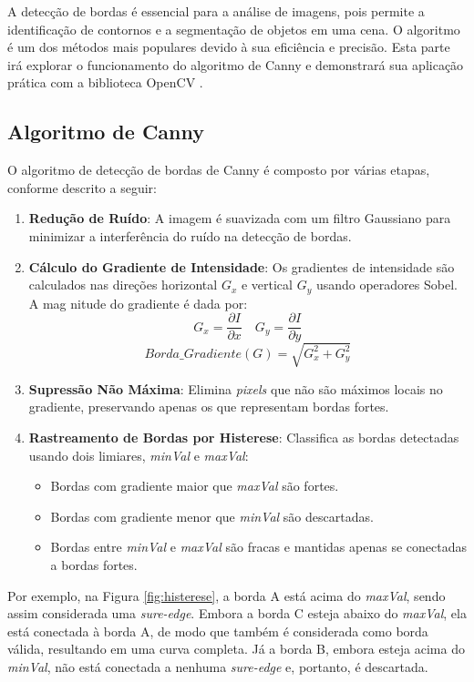 A detecção de bordas é essencial para a análise de imagens, pois permite a identificação de contornos e a segmentação de objetos em uma cena. O algoritmo \cite{Canny} é um dos métodos mais populares devido à sua eficiência e precisão. Esta parte irá explorar o funcionamento do algoritmo de Canny e demonstrará sua aplicação prática com a biblioteca OpenCV \cite{CannyAplicacao}.

\subsection{Algoritmo de Canny}

O algoritmo de detecção de bordas de Canny é composto por várias etapas, conforme descrito a seguir:

\begin{enumerate}
    \item \textbf{Redução de Ruído}: A imagem é suavizada com um filtro Gaussiano para minimizar a interferência do ruído na detecção de bordas.

    \item \textbf{Cálculo do Gradiente de Intensidade}: Os gradientes de intensidade são calculados nas direções horizontal \(G_x\) e vertical \(G_y\) usando operadores Sobel. A mag   nitude do gradiente é dada por:
    \[G_x = \frac{\partial I}{\partial x} \quad G_y = \frac{\partial I}{\partial y}\]
    \[Borda\_Gradiente(G) = \sqrt{G_{x}^{2} + G_{y}^{2}}\]

    \item \textbf{Supressão Não Máxima}: Elimina \textit{pixels} que não são máximos locais no gradiente, preservando apenas os que representam bordas fortes.

    \item \textbf{Rastreamento de Bordas por Histerese}: Classifica as bordas detectadas usando dois limiares, \textit{minVal} e \textit{maxVal}:
    \begin{itemize}
        \item Bordas com gradiente maior que \textit{maxVal} são fortes.
        \item Bordas com gradiente menor que \textit{minVal} são descartadas.
        \item Bordas entre \textit{minVal} e \textit{maxVal} são fracas e mantidas apenas se conectadas a bordas fortes.
    \end{itemize}
\end{enumerate}

Por exemplo, na Figura \autoref{fig:histerese}, a borda A está acima do \textit{maxVal}, sendo assim considerada uma \textit{sure-edge}. Embora a borda C esteja abaixo do \textit{maxVal}, ela está conectada à borda A, de modo que também é considerada como borda válida, resultando em uma curva completa. Já a borda B, embora esteja acima do \textit{minVal}, não está conectada a nenhuma \textit{sure-edge} e, portanto, é descartada.

